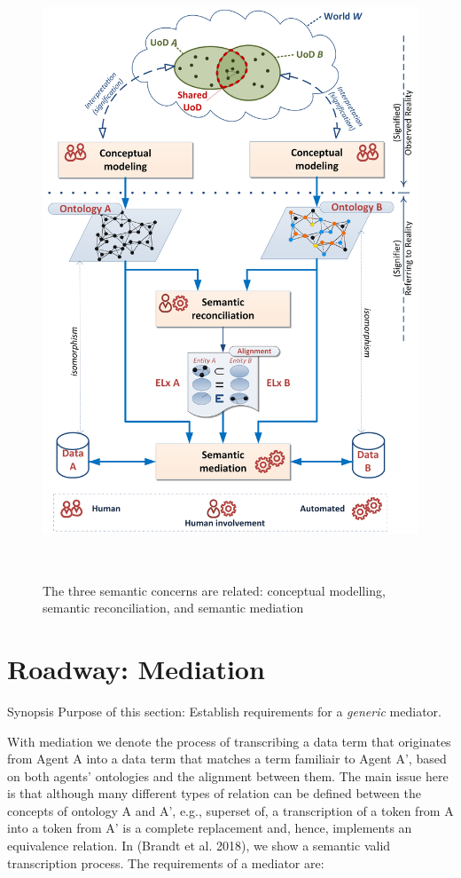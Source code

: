 \documentclass[a4paper,11pt,oneside,oldfontcommands]{memoir}
\theoremstyle{definition}
\theoremstyle{break}		%
\numberwithin{equation}{chapter}
\numberwithin{figure}{chapter}
\begin{document}
\begin{figure}
\hypertarget{fig:3Concerns}{%
\centering
\includegraphics[width=5.15625in,height=7.21875in]{src/images/3SemanticConcerns.png}
\caption{The three semantic concerns are related: conceptual modelling,
semantic reconciliation, and semantic mediation}\label{fig:3Concerns}
}
\end{figure}

\hypertarget{roadway-mediation}{%
\chapter{Roadway: Mediation}\label{roadway-mediation}}

Synopsis Purpose of this section: Establish requirements for a
\emph{generic} mediator.

With mediation we denote the process of transcribing a data term that
originates from Agent A into a data term that matches a term familiair
to Agent A', based on both agents' ontologies and the alignment between
them. The main issue here is that although many different types of
relation can be defined between the concepts of ontology A and A', e.g.,
superset of, a transcription of a token from A into a token from A' is a
complete replacement and, hence, implements an equivalence relation. In
(Brandt et al. 2018), we show a semantic valid transcription process.
The requirements of a mediator are:
\end{document}
